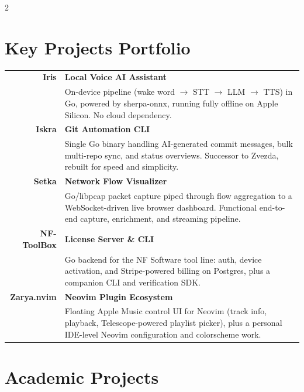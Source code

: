 \documentclass[lighthipster]{simplehipstercv}
\begin{document}
\begin{paracol}{2}
\vspace{1.2em}

\section*{Key Projects Portfolio}

\begin{tabular}{r| p{}}
    \textbf{Iris} & \textbf{Local Voice AI Assistant} \\
    & {\footnotesize On-device pipeline (wake word $\to$ STT $\to$ LLM $\to$ TTS) in Go, powered by sherpa-onnx, running fully offline on Apple Silicon. No cloud dependency.} \\[0.8em]

    \textbf{Iskra} & \textbf{Git Automation CLI} \\
    & {\footnotesize Single Go binary handling AI-generated commit messages, bulk multi-repo sync, and status overviews. Successor to Zvezda, rebuilt for speed and simplicity.} \\[0.8em]

    \textbf{Setka} & \textbf{Network Flow Visualizer} \\
    & {\footnotesize Go/libpcap packet capture piped through flow aggregation to a WebSocket-driven live browser dashboard. Functional end-to-end capture, enrichment, and streaming pipeline.} \\[0.8em]

    \textbf{NF-ToolBox} & \textbf{License Server \& CLI} \\
    & {\footnotesize Go backend for the NF Software tool line: auth, device activation, and Stripe-powered billing on Postgres, plus a companion CLI and verification SDK.} \\[0.8em]

    \textbf{Zarya.nvim} & \textbf{Neovim Plugin Ecosystem} \\
    & {\footnotesize Floating Apple Music control UI for Neovim (track info, playback, Telescope-powered playlist picker), plus a personal IDE-level Neovim configuration and colorscheme work.} \\
\end{tabular}

\vspace{1.2em}

\section*{Academic Projects}


\end{paracol}
\end{document}
